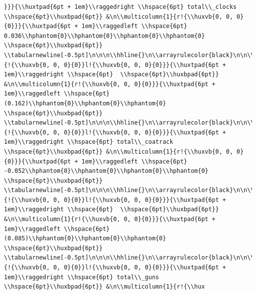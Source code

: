 \documentclass[11pt,preprint, authoryear]{elsarticle}
\numberwithin{equation}{section}
\numberwithin{figure}{section}
\numberwithin{table}{section}
\begin{document}
\begin{verbatim}
}}}{\\huxtpad{6pt + 1em}\\raggedright \\hspace{6pt} total\\_clocks \\hspace{6pt}\\huxbpad{6pt}} &\n\\multicolumn{1}{r!{\\huxvb{0, 0, 0}{0}}}{\\huxtpad{6pt + 1em}\\raggedleft \\hspace{6pt} 0.036\\hphantom{0}\\hphantom{0}\\hphantom{0}\\hphantom{0} \\hspace{6pt}\\huxbpad{6pt}} \\tabularnewline[-0.5pt]\n\n\n\\hhline{}\n\\arrayrulecolor{black}\n\n\\multicolumn{1}{!{\\huxvb{0, 0, 0}{0}}l!{\\huxvb{0, 0, 0}{0}}}{\\huxtpad{6pt + 1em}\\raggedright \\hspace{6pt}  \\hspace{6pt}\\huxbpad{6pt}} &\n\\multicolumn{1}{r!{\\huxvb{0, 0, 0}{0}}}{\\huxtpad{6pt + 1em}\\raggedleft \\hspace{6pt} (0.162)\\hphantom{0}\\hphantom{0}\\hphantom{0} \\hspace{6pt}\\huxbpad{6pt}} \\tabularnewline[-0.5pt]\n\n\n\\hhline{}\n\\arrayrulecolor{black}\n\n\\multicolumn{1}{!{\\huxvb{0, 0, 0}{0}}l!{\\huxvb{0, 0, 0}{0}}}{\\huxtpad{6pt + 1em}\\raggedright \\hspace{6pt} total\\_coatrack \\hspace{6pt}\\huxbpad{6pt}} &\n\\multicolumn{1}{r!{\\huxvb{0, 0, 0}{0}}}{\\huxtpad{6pt + 1em}\\raggedleft \\hspace{6pt} -0.052\\hphantom{0}\\hphantom{0}\\hphantom{0}\\hphantom{0} \\hspace{6pt}\\huxbpad{6pt}} \\tabularnewline[-0.5pt]\n\n\n\\hhline{}\n\\arrayrulecolor{black}\n\n\\multicolumn{1}{!{\\huxvb{0, 0, 0}{0}}l!{\\huxvb{0, 0, 0}{0}}}{\\huxtpad{6pt + 1em}\\raggedright \\hspace{6pt}  \\hspace{6pt}\\huxbpad{6pt}} &\n\\multicolumn{1}{r!{\\huxvb{0, 0, 0}{0}}}{\\huxtpad{6pt + 1em}\\raggedleft \\hspace{6pt} (0.085)\\hphantom{0}\\hphantom{0}\\hphantom{0} \\hspace{6pt}\\huxbpad{6pt}} \\tabularnewline[-0.5pt]\n\n\n\\hhline{}\n\\arrayrulecolor{black}\n\n\\multicolumn{1}{!{\\huxvb{0, 0, 0}{0}}l!{\\huxvb{0, 0, 0}{0}}}{\\huxtpad{6pt + 1em}\\raggedright \\hspace{6pt} total\\_guns \\hspace{6pt}\\huxbpad{6pt}} &\n\\multicolumn{1}{r!{\\hux
\end{verbatim}
\end{document}
